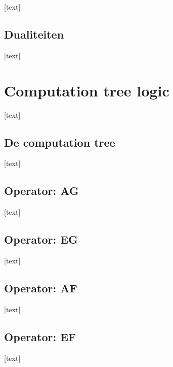 \documentclass{article}
\begin{document}
		[text]
		
		\subsection{Dualiteiten}
		
		[text]
	
	\newpage
	
	
	\section{Computation tree logic}
	
	[text]
		
		\subsection{De computation tree}
				
		[text]
		
		\subsection{Operator: AG}
				
		[text]
		
		\subsection{Operator: EG}
				
		[text]
		
		\subsection{Operator: AF}
				
		[text]
		
		\subsection{Operator: EF}
				
		[text]
		
\end{document}
